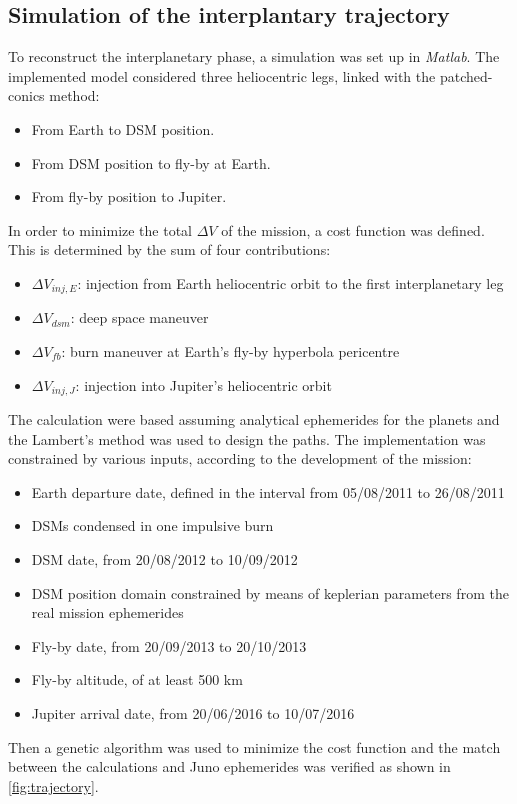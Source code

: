 \subsection{Simulation of the interplantary trajectory}
To reconstruct the interplanetary phase, a simulation was set up in \textit{Matlab}. The implemented model considered three heliocentric legs, linked with the patched-conics method:
\begin{itemize}
    \item From Earth to DSM position.
    \item From DSM position to fly-by at Earth.
    \item From fly-by position to Jupiter.
\end{itemize}
In order to minimize the total $\Delta V$ of the mission, a cost function was defined. This is determined by the sum of four contributions:
\begin{itemize}
    \item $\Delta V_{inj,E}$: injection from Earth heliocentric orbit to the first interplanetary leg
    \item $\Delta V_{dsm}$: deep space maneuver
    \item $\Delta V_{fb}$: burn maneuver at Earth's fly-by hyperbola pericentre
    \item $\Delta V_{inj,J}$: injection into Jupiter's heliocentric orbit
\end{itemize}
The calculation were based assuming analytical ephemerides for the planets and the Lambert's method was used to design the paths. The  implementation was constrained by various inputs, according to the development of the mission:
\begin{itemize}
    \item Earth departure date, defined in the interval from 05/08/2011 to 26/08/2011
    \item DSMs condensed in one impulsive burn
    \item DSM date, from 20/08/2012 to 10/09/2012
    \item DSM position domain constrained by means of keplerian parameters from the real mission ephemerides
    \item Fly-by date, from 20/09/2013 to 20/10/2013 
    \item Fly-by altitude, of at least 500 km
    \item Jupiter arrival date, from 20/06/2016 to 10/07/2016
\end{itemize}
Then a genetic algorithm was used to minimize the cost function and the match between the calculations and Juno ephemerides was verified as shown in \autoref{fig:trajectory}.

